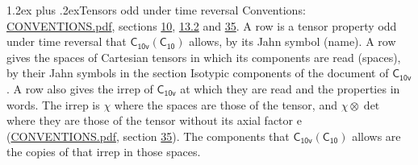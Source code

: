\documentclass[10pt,a4paper]{article}
\makeatletter
\renewcommand\section{\@startsection{section}{1}{\z@}{-3ex plus -1ex minus -.2ex}%
  {1.2ex plus .2ex}{\normalfont\large\sffamily\bfseries\color{parttitle}}}
\numberwithin{equation}{section}
\newcommand{\grp}[1]{\mathsf{#1}}
\newcommand{\irrprod}{\otimes}
\makeatother
\begin{document}
\section{Tensors odd under time reversal}\label{s:time_odd}
Conventions: \href{../../CONVENTIONS.pdf}{CONVENTIONS.pdf}, sections \href{../../../rotation/CONVENTIONS.pdf\#conv.10}{10}, \href{../../../rotation/CONVENTIONS.pdf\#conv.13.2}{13.2} and \href{../../CONVENTIONS.pdf\#conv.35}{35}.
\leavevmode\label{n:head.name.property}A row is a tensor property odd under time reversal that $\grp{C_{10v}}(\grp{C_{10}})$ allows, by its Jahn symbol (name). \label{n:head.spaces}A row gives the spaces of Cartesian tensors in which its components are read (spaces), by their Jahn symbols in the section Isotypic components of the document of \href{../../../rotation/data/pdf/C10v.pdf}{$\grp{C_{10v}}$}. \label{n:head.properties}A row also gives the irrep of $\grp{C_{10v}}$ at which they are read and the properties in words. The irrep is $\chi$ where the spaces are those of the tensor, and $\chi \irrprod \det$ where they are those of the tensor without its axial factor e (\href{../../CONVENTIONS.pdf}{CONVENTIONS.pdf}, section \href{../../CONVENTIONS.pdf\#conv.35}{35}). The components that $\grp{C_{10v}}(\grp{C_{10}})$ allows are the copies of that irrep in those spaces.
\end{document}
